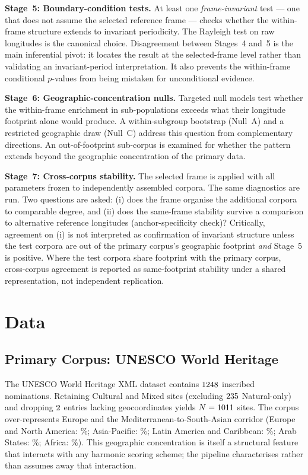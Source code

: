 \documentclass[12pt,a4paper]{article}
\begin{document}
\textbf{Stage~5: Boundary-condition tests.} At least one
\emph{frame-invariant} test — one that does not assume the selected
reference frame — checks whether the within-frame structure extends
to invariant periodicity. The Rayleigh test on raw longitudes is the
canonical choice. Disagreement between Stages~4 and~5 is the
main inferential pivot: it locates the result at the selected-frame
level rather than validating an invariant-period interpretation. It
also prevents the within-frame conditional $p$-values from being
mistaken for unconditional evidence.

\textbf{Stage~6: Geographic-concentration nulls.} Targeted null models
test whether the within-frame enrichment in sub-populations exceeds
what their longitude footprint alone would produce. A within-subgroup
bootstrap (Null~A) and a restricted geographic draw (Null~C) address
this question from complementary directions. An out-of-footprint
sub-corpus is examined for whether the pattern extends beyond the
geographic concentration of the primary data.

\textbf{Stage~7: Cross-corpus stability.} The selected frame is
applied with all parameters frozen to independently assembled corpora.
The same diagnostics are run. Two questions are asked: (i) does the
frame organise the additional corpora to comparable degree, and
(ii) does the same-frame stability survive a comparison to alternative
reference longitudes (anchor-specificity check)? Critically, agreement
on (i) is not interpreted as confirmation of invariant structure unless
the test corpora are out of the primary corpus's geographic footprint
\emph{and} Stage~5 is positive. Where the test corpora share footprint
with the primary corpus, cross-corpus agreement is reported as
same-footprint stability under a shared representation, not independent
replication.

\section{Data}
\label{sec:data}

\subsection{Primary Corpus: UNESCO World Heritage}

The UNESCO World Heritage XML dataset \citep{unescowhc2024xml} contains
$1248$ inscribed nominations. Retaining Cultural and Mixed sites
(excluding $235$ Natural-only) and dropping $2$
entries lacking geocoordinates yields $N = 1011$ sites. The
corpus over-represents Europe and the Mediterranean-to-South-Asian
corridor (Europe and North America: \CorpusPctEurope\%; Asia-Pacific:
\CorpusPctAsiaPac\%; Latin America and Caribbean: \CorpusPctLatAm\%;
Arab States: \CorpusPctArabStates\%; Africa: \CorpusPctAfrica\%). This
geographic concentration is itself a structural feature that interacts
with any harmonic scoring scheme; the pipeline characterises rather
than assumes away that interaction.
\end{document}

